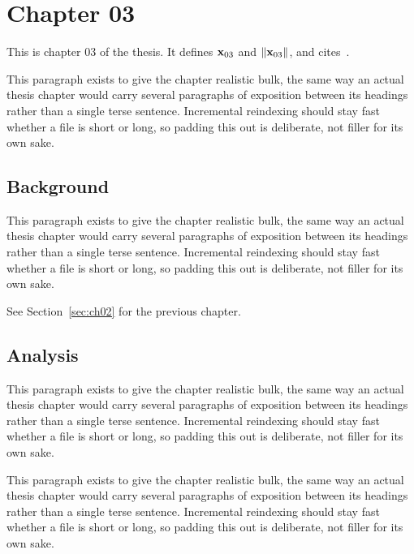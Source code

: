 \section{Chapter 03}
\label{sec:ch03}

This is chapter 03 of the thesis. It defines $\mathbf{x}_{03}$ and $\lVert \mathbf{x}_{03} \rVert$, and cites~\cite{ref1}.

This paragraph exists to give the chapter realistic bulk, the same way an actual thesis chapter would carry several paragraphs of exposition between its headings rather than a single terse sentence. Incremental reindexing should stay fast whether a file is short or long, so padding this out is deliberate, not filler for its own sake.

\subsection{Background}
\label{sec:ch03:background}

This paragraph exists to give the chapter realistic bulk, the same way an actual thesis chapter would carry several paragraphs of exposition between its headings rather than a single terse sentence. Incremental reindexing should stay fast whether a file is short or long, so padding this out is deliberate, not filler for its own sake.

See Section~\ref{sec:ch02} for the previous chapter.

\subsection{Analysis}
\label{sec:ch03:analysis}

This paragraph exists to give the chapter realistic bulk, the same way an actual thesis chapter would carry several paragraphs of exposition between its headings rather than a single terse sentence. Incremental reindexing should stay fast whether a file is short or long, so padding this out is deliberate, not filler for its own sake.

This paragraph exists to give the chapter realistic bulk, the same way an actual thesis chapter would carry several paragraphs of exposition between its headings rather than a single terse sentence. Incremental reindexing should stay fast whether a file is short or long, so padding this out is deliberate, not filler for its own sake.
